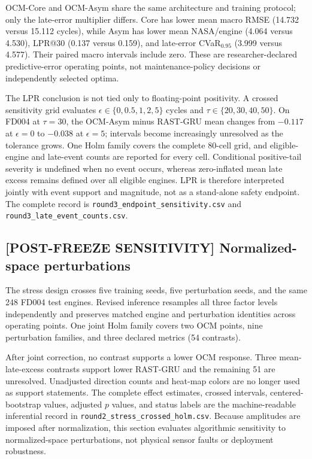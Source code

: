 OCM-Core and OCM-Asym share the same architecture and training protocol; only the late-error multiplier differs. Core has lower mean macro RMSE (14.732 versus 15.112 cycles), while Asym has lower mean NASA/engine (4.064 versus 4.530), LPR@30 (0.137 versus 0.159), and late-error CVaR$_{0.95}$ (3.999 versus 4.577). Their paired macro intervals include zero. These are researcher-declared predictive-error operating points, not maintenance-policy decisions or independently selected optima.



The LPR conclusion is not tied only to floating-point positivity. A crossed sensitivity grid evaluates $\epsilon\in\{0,0.5,1,2,5\}$ cycles and $\tau\in\{20,30,40,50\}$. On FD004 at $\tau=30$, the OCM-Asym minus RAST-GRU mean changes from $-0.117$ at $\epsilon=0$ to $-0.038$ at $\epsilon=5$; intervals become increasingly unresolved as the tolerance grows. One Holm family covers the complete 80-cell grid, and eligible-engine and late-event counts are reported for every cell. Conditional positive-tail severity is undefined when no event occurs, whereas zero-inflated mean late excess remains defined over all eligible engines. LPR is therefore interpreted jointly with event support and magnitude, not as a stand-alone safety endpoint. The complete record is \texttt{round3\_endpoint\_sensitivity.csv} and \texttt{round3\_late\_event\_counts.csv}.

\subsection{[POST-FREEZE SENSITIVITY] Normalized-space perturbations}

The stress design crosses five training seeds, five perturbation seeds, and the same 248 FD004 test engines. Revised inference resamples all three factor levels independently and preserves matched engine and perturbation identities across operating points. One joint Holm family covers two OCM points, nine perturbation families, and three declared metrics (54 contrasts).



After joint correction, no contrast supports a lower OCM response. Three mean-late-excess contrasts support lower RAST-GRU and the remaining 51 are unresolved. Unadjusted direction counts and heat-map colors are no longer used as support statements. The complete effect estimates, crossed intervals, centered-bootstrap values, adjusted $p$ values, and status labels are the machine-readable inferential record in \texttt{round2\_stress\_crossed\_holm.csv}. Because amplitudes are imposed after normalization, this section evaluates algorithmic sensitivity to normalized-space perturbations, not physical sensor faults or deployment robustness.

